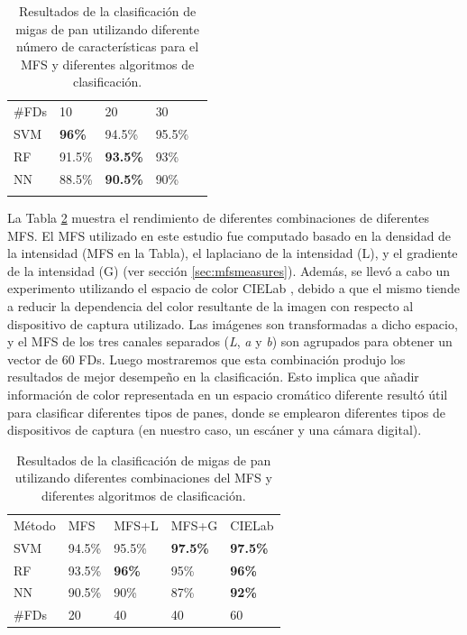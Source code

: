 \begin{table}[h!]
\center
\begin{tabular}{lllll}
\hline\noalign{\smallskip}
\#FDs & 10  & 20 & 30 \\
\noalign{\smallskip}\hline\noalign{\smallskip}
SVM & \textbf{96\%} & 94.5\% & 95.5\% \\
RF  & 91.5\% & \textbf{93.5\%} & 93\% \\
NN & 88.5\% & \textbf{90.5\%} & 90\% \\
\noalign{\smallskip}\hline
\end{tabular}
\caption{Resultados de la clasificación de migas de pan utilizando diferente número de características para el MFS y diferentes algoritmos de clasificación.}
\label{tab:number}       %
\end{table}


La Tabla \ref{tab:mfs} muestra el rendimiento de diferentes combinaciones de diferentes MFS.
El MFS utilizado en este estudio fue computado basado en la densidad de la intensidad (MFS en la Tabla), el laplaciano de la intensidad (L), y el gradiente de la intensidad (G) (ver sección \ref{sec:mfsmeasures}).
Además, se llevó a cabo un experimento utilizando el espacio de color CIELab \cite{Hunter58}, debido a que el mismo tiende a reducir la dependencia del color resultante de la imagen con respecto al dispositivo de captura utilizado.
Las imágenes son transformadas a dicho espacio, y el MFS de los tres canales separados ({\em L}, {\em a} y {\em b}) son agrupados para obtener un vector de $60$ FDs.
Luego mostraremos que esta combinación produjo los resultados de mejor desempeño en la clasificación.
Esto implica que añadir información de color representada en un espacio cromático diferente resultó útil para clasificar diferentes tipos de panes, donde se emplearon diferentes tipos de dispositivos de captura (en nuestro caso, un escáner y una cámara digital).



\begin{table}[h!]
\center
\begin{tabular}{lllll}
\hline\noalign{\smallskip}
Método & MFS & MFS+L & MFS+G & CIELab  \\
\noalign{\smallskip}\hline\noalign{\smallskip}
SVM & 94.5\% & 95.5\% & \textbf{97.5\%} & \textbf{97.5\%} \\
RF  & 93.5\% & \textbf{96\%} & 95\% & \textbf{96\%} \\
NN & 90.5\% & 90\% & 87\% & \textbf{92\%} \\
\noalign{\smallskip}\hline
\#FDs & 20 & 40 & 40 & 60 \\
\hline
\end{tabular}
\caption{Resultados de la clasificación de migas de pan utilizando diferentes combinaciones del MFS y diferentes algoritmos de clasificación.}
\label{tab:mfs}       %
\end{table}


